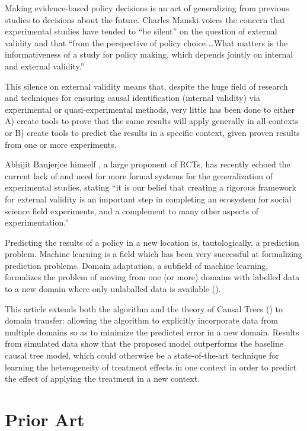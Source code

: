 \documentclass[a4paper,12pt]{article}
\theoremstyle{proposition}
\begin{document}
Making evidence-based policy decisions is an act of generalizing from previous studies to decisions about the future. Charles Manski \parencite*{Manski2013} voices the concern that experimental studies have tended to ``be silent'' on the question of external validity and that ``from the perspective of policy choice \ldots What matters is the informativeness of a study for policy making, which depends jointly on internal and external validity.''

This silence on external validity means that, despite the huge field of research and techniques for ensuring causal identification (internal validity) via experimental or quasi-experimental methods, very little has been done to either A) create tools to prove that the same results will apply generally in all contexts or B) create tools to predict the results in a specific context, given proven results from one or more experiments.

Abhijit Banjerjee himself \parencite*{Snowberg2016}, a large proponent of RCTs, has recently echoed the current lack of and need for more formal systems for the generalization of experimental studies, stating ``it is our belief that creating a rigorous framework for external validity is an important step in completing an ecosystem for social science field experiments, and a complement to many other aspects of experimentation.''

Predicting the results of a policy in a new location is, tautologically, a prediction problem. Machine learning is a field which has been very successful at formalizing prediction problems. Domain adaptation, a subfield of machine learning, formalizes the problem of moving from one (or more) domains with labelled data to a new domain where only unlaballed data is available (\cite[for a survey, see][]{Pan2010}).

This article extends both the algorithm and the theory of Causal Trees (\cite{Athey2016}) to domain transfer: allowing the algorithm to explicitly incorporate data from multiple domains so as to minimize the predicted error in a new domain. Results from simulated data show that the proposed model outperforms the baseline causal tree model, which could otherwise be a state-of-the-art technique for learning the heterogeneity of treatment effects in one context in order to predict the effect of applying the treatment in a new context.


\section{Prior Art}
\end{document}
